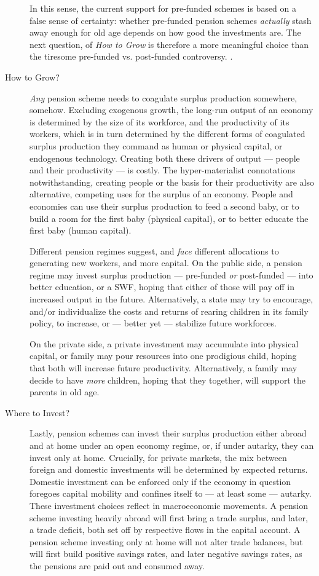 \documentclass[11pt,a4paper,oneside]{article}
\begin{document}
\begin{description}
{		In this sense, the current support for pre-funded schemes is based on a false sense of certainty:
		whether pre-funded pension schemes \emph{actually} stash away enough for old age depends on how good the investments are.
		The next question, of \emph{How to Grow} is therefore a more meaningful choice than the tiresome pre-funded vs. post-funded controversy.
	}.
	\item[How to Grow?] \emph{Any} pension scheme needs to coagulate surplus production somewhere, somehow.
	Excluding exogenous growth, the long-run output of an economy is determined by the size of its workforce, and the productivity of its workers, which is in turn determined by the different forms of coagulated surplus production they command as human or physical capital, or endogenous technology.
	Creating both these drivers of output --- people and their productivity --- is costly.
	The hyper-materialist connotations notwithstanding, creating people or the basis for their productivity are also alternative, competing uses for the surplus of an economy.
	People and economies can use their surplus production to feed a second baby, or to build a room for the first baby (physical capital), or to better educate the first baby (human capital).

	Different pension regimes suggest, and \emph{face} different allocations to generating new workers, and more capital.
	On the public side, a pension regime may invest surplus production --- pre-funded \emph{or} post-funded --- into better education, or a \gls{SWF}, hoping that either of those will pay off in increased output in the future.
	Alternatively, a state may try to encourage, and/or individualize the costs and returns of rearing children in its family policy, to increase, or --- better yet --- stabilize future workforces.

	On the private side, a private investment may accumulate into physical capital, or family may pour resources into one prodigious child, hoping that both will increase future productivity.
	Alternatively, a family may decide to have \emph{more} children, hoping that they together, will support the parents in old age.

	\item[Where to Invest?] Lastly, pension schemes can invest their surplus production either abroad and at home under an open economy regime, or, if under autarky, they can invest only at home.
	Crucially, for private markets, the mix between foreign and domestic investments will be determined by expected returns.
	Domestic investment can be enforced only if the economy in question foregoes capital mobility and confines itself to --- at least some --- autarky. \\
	These investment choices reflect in macroeconomic movements.
	A pension scheme investing heavily abroad will first bring a trade surplus, and later, a trade deficit, both set off by respective flows in the capital account.
	A pension scheme investing only at home will not alter trade balances, but will first build positive savings rates, and later negative savings rates, as the pensions are paid out and consumed away.
\end{description}
\end{document}
